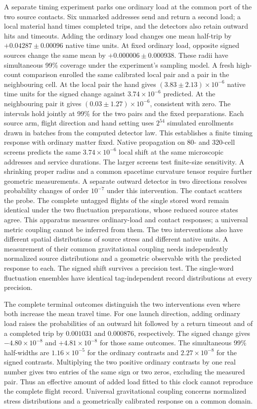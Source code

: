\documentclass[11pt]{article}
\begin{document}
A separate timing experiment parks one ordinary load at the common port
of the two source contacts. Six unmarked addresses send and return a
second load; a local material hand times completed trips, and the
detectors also retain outward hits and timeouts. Adding the ordinary
load changes one mean half-trip by $+0.04287\pm0.00096$ native time
units. At fixed ordinary load, opposite signed sources change the same
mean by $+0.000006\pm0.000938$. These radii have simultaneous 99\%
coverage under the experiment's sampling model. A fresh high-count
comparison enrolled the same calibrated local pair and a pair
in the neighbouring cell. At the local pair the hand gives
$(3.83\pm2.13)\times10^{-6}$ native time units for the signed change
against $3.74\times10^{-6}$ predicted. At the neighbouring pair it gives
$(0.03\pm1.27)\times10^{-6}$, consistent with zero. The intervals
hold jointly at 99\% for the two pairs and the fixed preparations.
Each source arm, flight direction and hand setting uses $2^{54}$
simulated enrollments drawn in batches from the computed detector law.
This establishes a finite timing response with ordinary matter fixed.
Native propagation on 80- and 320-cell screens predicts the same
$3.74\times10^{-6}$ local shift at the same microscopic addresses and
service durations. The larger screens test finite-size sensitivity.
A shrinking proper radius and a common spacetime curvature tensor
require further geometric measurements.
A separate outward
detector in two directions resolves probability changes of order
$10^{-7}$ under this intervention. The contact scatters the probe.
The complete untagged flights of the single stored word remain identical under the two fluctuation
preparations, whose reduced source states agree. This apparatus measures
ordinary-load and contact responses; a universal metric coupling cannot
be inferred from them. The two interventions also have different spatial
distributions of source stress and different native units. A measurement
of their common gravitational coupling needs independently normalized
source distributions and a geometric observable with the predicted
response to each. The signed shift survives a precision test. The
single-word fluctuation ensembles have identical tag-independent record
distributions at every precision.

The complete terminal outcomes distinguish the two interventions even
where both increase the mean travel time. For one launch direction,
adding ordinary load raises the probabilities of an outward hit followed
by a return timeout and of a completed trip by $0.001031$ and $0.000876$,
respectively. The signed change gives $-4.80\times10^{-8}$ and
$+4.81\times10^{-8}$ for those same outcomes. The simultaneous 99\%
half-widths are $1.16\times10^{-5}$ for the ordinary contrasts and
$2.27\times10^{-8}$ for the signed contrasts. Multiplying the two
positive ordinary contrasts by one real number gives two entries of the
same sign or two zeros, excluding the measured pair. Thus an effective
amount of added load fitted to this clock cannot reproduce the complete
flight record. Universal gravitational coupling concerns normalized
stress distributions and a geometrically calibrated response on a common
domain.
\end{document}
